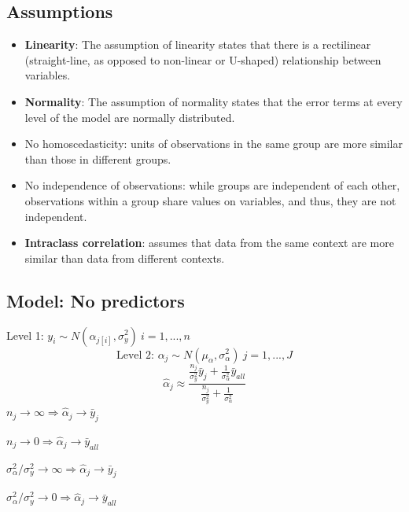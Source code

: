 \documentclass[10pt,landscape, fleqn]{article}
\begin{document}
\begin{multicols}{3}
			\subsection{Assumptions}
				\begin{itemize}
					\item \textbf{Linearity}: The assumption of linearity states that there is a rectilinear (straight-line, as opposed to non-linear or U-shaped) relationship between variables.
					\item \textbf{Normality}: The assumption of normality states that the error terms at every level of the model are normally distributed.
					\item No homoscedasticity: units of observations in the same group are more similar than those in different groups.
					\item No independence of observations: while groups are independent of each other, observations within a group share values on variables, and thus, they are not independent.
					\item \textbf{Intraclass correlation}: assumes that data from the same context are more similar than data from different contexts. 
				\end{itemize}
			\subsection{Model: No predictors}
				Level 1: $ y_i \sim N(\alpha_{j[i]}, \sigma_y^2)\ i=1,...,n $
				\[\mbox{Level 2: } \alpha_j \sim N(\mu_\alpha, \sigma^2_\alpha)\ j=1,...,J \]
				\[ \hat{\alpha}_{j} \approx \frac{\frac{n_j}{\sigma^2_y}\bar{y}_j+\frac{1}{\sigma_\alpha^2}\bar{y}_{all}}{\frac{n_j}{\sigma^2_y}+\frac{1}{\sigma_\alpha^2}} \]
				$n_j \rightarrow \infty \Rightarrow \hat{\alpha}_j \rightarrow \bar{y}_j$ \par 
				$n_j \rightarrow 0 \Rightarrow \hat{\alpha}_j \rightarrow \bar{y}_{all}$ \par 
				$\sigma_\alpha^2/\sigma_y^2 \rightarrow \infty \Rightarrow \hat{\alpha}_j \rightarrow \bar{y}_j$ \par 
				$\sigma_\alpha^2/\sigma_y^2 \rightarrow 0 \Rightarrow \hat{\alpha}_j \rightarrow \bar{y}_{all}$ \par 

\end{multicols}
\end{document}
